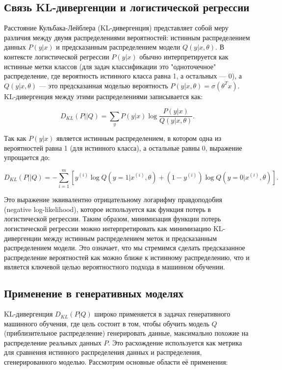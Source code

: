 \subsection*{Связь KL-дивергенции и логистической регрессии}
Расстояние Кульбака-Лейблера (KL-дивергенция) представляет собой меру различия между двумя распределениями вероятностей: истинным распределением данных $P(y|x)$ и предсказанным распределением модели  $Q(y|x, \theta)$. В контексте логистической регрессии $P(y|x)$ обычно интерпретируется как истинные метки классов (для задач классификации это "одноточечное" 
распределение, где вероятность истинного класса равна 1, а остальных — 0), а $Q(y|x, \theta)$ — это предсказанная моделью вероятность $P(y|x, \theta) = \sigma(\theta^T x)$. KL-дивергенция между этими распределениями записывается как:

\[
D_{KL}(P || Q) = \sum_{y} P(y|x) \log \frac{P(y|x)}{Q(y|x, \theta)}.
\]

Так как $P(y|x)$ является истинным распределением, в котором одна из вероятностей равна 1 (для истинного класса), а остальные равны 0, выражение упрощается до:

\[
D_{KL}(P || Q) = - \sum_{i=1}^m \left[ y^{(i)} \log Q(y=1|x^{(i)}, \theta) + (1 - y^{(i)}) \log Q(y=0|x^{(i)}, \theta) \right].
\]

Это выражение эквивалентно отрицательному логарифму правдоподобия (negative log-likelihood), которое используется как функция потерь в логистической регрессии. Таким образом, минимизация функции потерь логистической регрессии можно интерпретировать как минимизацию KL-дивергенции между истинным распределением меток и предсказанным распределением модели. Это означает, что мы стремимся сделать предсказанное распределение вероятностей как можно ближе к истинному распределению, что и является ключевой целью вероятностного подхода в машинном обучении.


\subsection*{Применение в генеративных моделях}
KL-дивергенция $D_{KL}(P | Q)$ широко применяется в задачах генеративного машинного обучения, где цель состоит в том, чтобы обучить модель $ Q $ (приблизительное распределение) генерировать данные, максимально похожие на распределение реальных данных $P$. Это расхождение используется как метрика для сравнения истинного распределения данных и распределения, сгенерированного моделью. Рассмотрим основные области её применения:

